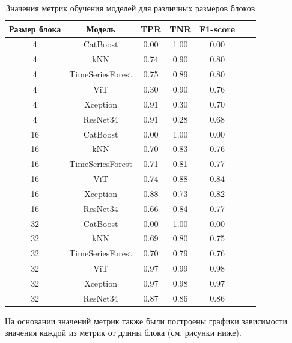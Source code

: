 \documentclass[spec, och, diploma]{SCWorks}
\begin{document}
        \begin{table}[H]
            \centering
            \begin{tabular}{|c|c|c|c|c|c|c|}
            \hline
            Размер блока & Модель & TPR & TNR & F1-score \\ \hline
            4  & CatBoost & 0.00 & 1.00 & 0.00 \\ 
            4  & kNN & 0.74 & 0.90 & 0.80 \\ 
            4  & TimeSeriesForest & 0.75 & 0.89 & 0.80 \\ 
            4  & ViT & 0.30 & 0.90 & 0.76 \\ 
            4  & Xception & 0.91 & 0.30 & 0.70 \\ 
            4  & ResNet34 & 0.91 & 0.28 & 0.68 \\ \hline
            16 & CatBoost & 0.00 & 1.00 & 0.00 \\ 
            16 & kNN & 0.70 & 0.83 & 0.76 \\ 
            16 & TimeSeriesForest & 0.71 & 0.81 & 0.77 \\ 
            16 & ViT & 0.74 & 0.88 & 0.84 \\ 
            16 & Xception & 0.88 & 0.73 & 0.82 \\ 
            16 & ResNet34 & 0.66 & 0.84 & 0.77 \\ \hline
            32 & CatBoost & 0.00 & 1.00 & 0.00 \\ 
            32 & kNN & 0.69 & 0.80 & 0.75 \\ 
            32 & TimeSeriesForest & 0.70 & 0.79 & 0.76 \\ 
            32 & ViT & 0.97 & 0.99 & 0.98 \\ 
            32 & Xception & 0.97 & 0.98 & 0.97 \\ 
            32 & ResNet34 & 0.87 & 0.86 & 0.86 \\ \hline
            \end{tabular}
            \captionsetup{justification=centering}
            \caption{Значения метрик обучения моделей для различных размеров блоков}
        \end{table}
    
    На основании значений метрик также были построены графики зависимости
    значения каждой из метрик от длины блока (см. рисунки ниже).
\end{document}
